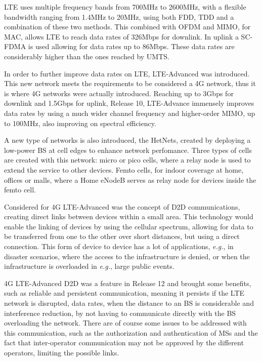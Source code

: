 \gls{LTE} uses multiple frequency bands from 700MHz to 2600MHz, with a flexible bandwidth ranging from 1.4MHz to 20MHz, using both \gls{FDD}, \gls{TDD} and a combination of these two methods. This combined with \gls{OFDM} and \gls{MIMO}, for \gls{MAC}, allows \gls{LTE} to reach data rates of 326Mbps for downlink. In uplink a \gls{SC-FDMA} is used allowing for data rates up to 86Mbps. These data rates are considerably higher than the ones reached by \gls{UMTS}.

In order to further improve data rates on \gls{LTE}, \gls{LTE}-Advanced was introduced. This new network meets the requirements to be considered a 4G network, thus it is where 4G networks were actually introduced. Reaching up to 3Gbps for downlink and 1.5Gbps for uplink, Release 10, \gls{LTE}-Advance immensely improves data rates by using a much wider channel frequency and higher-order \gls{MIMO}, up to 100MHz, also improving on spectral efficiency.

A new type of networks is also introduced, the \glspl{HetNet}, created by deploying a low-power \gls{BS} at cell edges to enhance network perfomance. Three types of cells are created with this network: micro or pico cells, where a relay node is used to extend the service to other devices. Femto cells, for indoor coverage at home, offices or malls, where a Home eNodeB serves as relay node for devices inside the femto cell.

Considered for 4G \gls{LTE}-Advanced was the concept of D2D communications, creating direct links between devices within a small area. This technology would enable the linking of devices by using the cellular spectrum, allowing for data to be transferred from one to the other over short distances, but using a direct connection. This form of device to device has a lot of applications, \textit{e.g.}, in disaster scenarios, where the access to the infrastructure is denied, or when the infrastructure is overloaded in \textit{e.g.}, large public events.

4G \gls{LTE}-Advanced D2D was a feature in Release 12 and brought some benefits, such as reliable and persistent communication, meaning it persists if the \gls{LTE} network is disrupted, data rates, when the distance to an \gls{BS} is considerable and interference reduction, by not having to communicate directly with the \gls{BS} overloading the network. There are of course some issues to be addressed with this communication, such as the authorization and authentication of \glspl{MS} and the fact that inter-operator communication may not be approved by the different operators, limiting the possible links.












